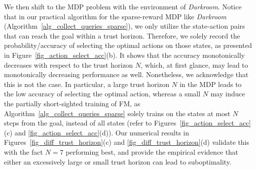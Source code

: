 We then shift to the MDP problem with the environment of \textit{Darkroom}.
Notice that in our practical algorithm for the sparse-reward MDP like \textit{Darkroom} (Algorithm~\ref{alg_collect_queries_sparse}), we only utilize the state-action pairs that can reach the goal within a trust horizon. Therefore, we solely record the probability/accuracy of selecting the optimal actions on those states, as presented in Figure~\ref{fig_action_select_acc}(b). It shows that the accuracy monotonically decreases with respect to the trust horizon $N$, which, at first glance, may lead to monotonically decreasing performance as well. Nonetheless, we acknowledge that this is not the case.
%
In particular, a large trust horizon $N$ in the MDP leads to the low accuracy of selecting the optimal action, whereas a small $N$ may induce the partially short-sighted training of FM, as Algorithm~\ref{alg_collect_queries_sparse} solely trains on the states at most $N$ steps from the goal, instead of all states (refer to Figures~\ref{fig_action_select_acc}(c) and \ref{fig_action_select_acc}(d)).
%
Our numerical results in Figures~\ref{fig_diff_trust_horizon}(c) and \ref{fig_diff_trust_horizon}(d) validate this with the fact $N=7$ performing best, and provide the empirical evidence that either an excessively large or small trust horizon can lead to suboptimality.

%
%
%



